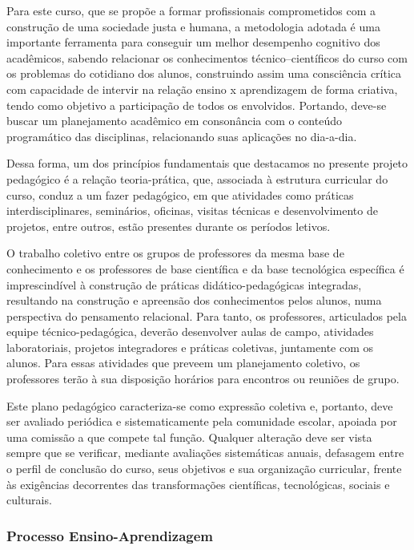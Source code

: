 Para este curso, que se propõe a formar profissionais comprometidos com a construção de uma sociedade justa e humana, a metodologia adotada é uma importante ferramenta para conseguir um melhor desempenho cognitivo dos acadêmicos, sabendo relacionar os conhecimentos técnico–científicos do curso com os problemas do cotidiano dos alunos, construindo assim uma consciência crítica com capacidade de intervir na relação ensino x aprendizagem de forma criativa, tendo como objetivo a participação de todos os envolvidos. Portando, deve-se buscar um planejamento acadêmico em consonância com o conteúdo programático das disciplinas, relacionando suas aplicações no dia-a-dia.

Dessa forma, um dos princípios fundamentais que destacamos no presente projeto pedagógico é a relação teoria-prática, que, associada à estrutura curricular do curso, conduz a um fazer pedagógico, em que atividades como práticas interdisciplinares, seminários, oficinas, visitas técnicas e desenvolvimento de projetos, entre outros, estão presentes durante os períodos letivos.  

O trabalho coletivo entre os grupos de professores da mesma base de conhecimento e os professores de base científica e da base tecnológica específica é imprescindível à construção de práticas didático-pedagógicas integradas, resultando na construção e apreensão dos conhecimentos pelos alunos, numa perspectiva do pensamento relacional. Para tanto, os professores, articulados pela equipe técnico-pedagógica, deverão desenvolver aulas de campo, atividades laboratoriais, projetos integradores e práticas coletivas, juntamente com os alunos. Para essas atividades que preveem um planejamento coletivo, os professores terão à sua disposição horários para encontros ou reuniões de grupo.

Este plano pedagógico caracteriza-se como expressão coletiva e, portanto, deve ser avaliado periódica e sistematicamente pela comunidade escolar, apoiada por uma comissão a que compete tal função. Qualquer alteração deve ser vista sempre que se verificar, mediante avaliações sistemáticas anuais, defasagem entre o perfil de conclusão do curso, seus objetivos e sua organização curricular, frente às exigências decorrentes das transformações científicas, tecnológicas, sociais e culturais.

\subsubsection{Processo Ensino-Aprendizagem}

